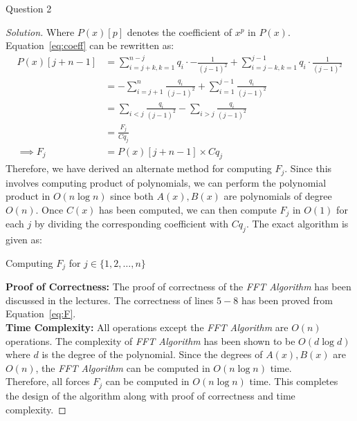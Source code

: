 \begin{solution}{Question 2}
\begin{proof}[Solution]
      Where $P(x)[p]$ denotes the coefficient of $x^p$ in $P(x)$.\\
      Equation~\ref{eq:coeff} can be rewritten as:
      \begin{equation}\label{eq:F}
        \begin{split}
          P(x)[j+n-1] &= \sum_{i=j+k, k=1}^{n-j}{q_i\cdot -\frac{1}{{(j-1)}^2}} + \sum_{i=j-k, k=1}^{j-1}{q_i\cdot \frac{1}{{(j-1)}^2}}\\
                      &= -\sum_{i=j+1}^n{\frac{q_i}{{(j-1)}^2}} + \sum_{i=1}^{j-1}{\frac{q_i}{{(j-1)}^2}}\\
                      &= \sum_{i<j}{\frac{q_i}{{(j-1)}^2}} - \sum_{i>j}{\frac{q_i}{{(j-1)}^2}}\\
                      &= \frac{F_j}{C q_j}\\
          \implies F_j &= P(x)[j+n-1] \times C q_j
        \end{split}
      \end{equation}
      Therefore, we have derived an alternate method for computing $F_j$. Since this involves computing product of polynomials, we can perform the polynomial product in $O(n\log{n})$ since both $A(x), B(x)$ are polynomials of degree $O(n)$. Once $C(x)$ has been computed, we can then compute $F_j$ in $O(1)$ for each $j$ by dividing the corresponding coefficient with $C q_j$. The exact algorithm is given as:
      \begin{algorithm}[H]
        \caption{Computing $F_j$ for $j\in \{1, 2, \ldots, n\}$}
        \begin{algorithmic}[1]
              
             
             
            \EndFor{}
          \EndProcedure{}
        \end{algorithmic}
      \end{algorithm}
      \textbf{Proof of Correctness:} The proof of correctness of the \textit{FFT Algorithm} has been discussed in the lectures. The correctness of lines $5-8$ has been proved from Equation~\ref{eq:F}.\\
      \textbf{Time Complexity:} All operations except the \textit{FFT Algorithm} are $O(n)$ operations. The complexity of \textit{FFT Algorithm} has been shown to be $O(d\log{d})$ where $d$ is the degree of the polynomial. Since the degrees of $A(x), B(x)$ are $O(n)$, the \textit{FFT Algorithm} can be computed in $O(n\log{n})$ time.\\
      Therefore, all forces $F_j$ can be computed in $O(n\log{n})$ time. This completes the design of the algorithm along with proof of correctness and time complexity.
    \end{proof}
\end{solution}
